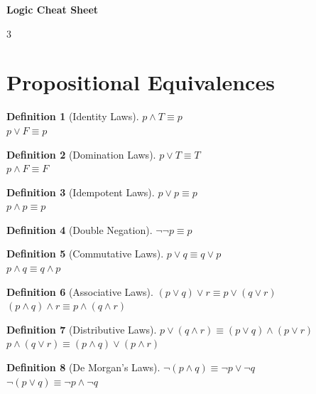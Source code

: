 \documentclass[8pt]{article}
\theoremstyle{definition}
\newtheorem*{defn}{Definition}
\begin{document}
\begin{center}
\textbf{\large Logic Cheat Sheet}
\end{center}
\vspace{-6pt}
\begin{multicols}{3}
\small
\section*{Propositional Equivalences}
\begin{defn}[Identity Laws]
$p \land T \equiv p \qquad$\\
$p \lor F \equiv p$
\end{defn}

\begin{defn}[Domination Laws]
$p \lor T \equiv T \qquad$\\
$p \land F \equiv F$
\end{defn}

\begin{defn}[Idempotent Laws]
$p \lor p \equiv p \qquad$\\
$p \land p \equiv p$
\end{defn}

\begin{defn}[Double Negation]
$\lnot \lnot p \equiv p$
\end{defn}

\begin{defn}[Commutative Laws]
$p \lor q \equiv q \lor p$\\
$p \land q \equiv q \land p$
\end{defn}

\begin{defn}[Associative Laws]
$(p \lor q) \lor r \equiv p \lor (q \lor r)$\\
$(p \land q) \land r \equiv p \land (q \land r)$
\end{defn}

\begin{defn}[Distributive Laws]
$p \lor (q \land r) \equiv (p \lor q) \land (p \lor r)$\\
$p \land (q \lor r) \equiv (p \land q) \lor (p \land r)$
\end{defn}

\begin{defn}[De Morgan's Laws]

$\lnot (p \land q) \equiv \lnot p \lor \lnot q$\\
$\lnot (p \lor q) \equiv \lnot p \land \lnot q$

\end{defn}


\end{multicols}
\end{document}
